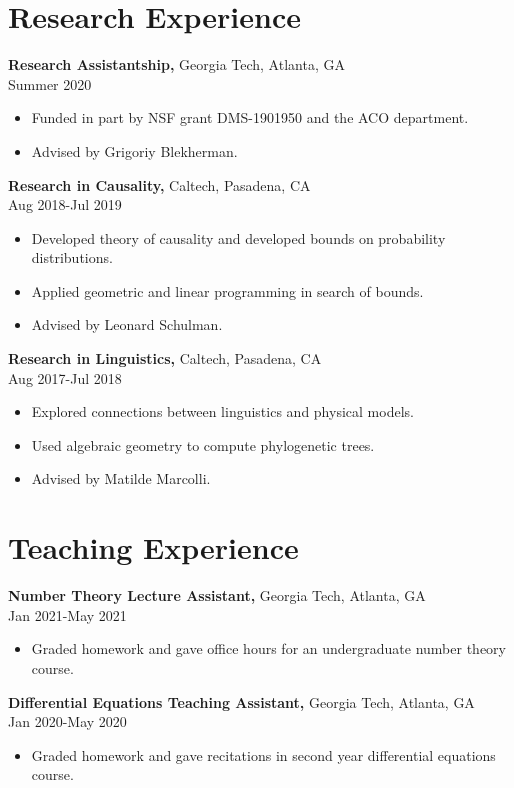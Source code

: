 \documentclass[margin]{res}
\begin{document}
\begin{resume}
\section{Research Experience}
{\bf Research Assistantship,} Georgia Tech, Atlanta, GA \\ Summer 2020
\begin{itemize} \itemsep -2pt %
\item Funded in part by NSF grant DMS-1901950 and the ACO department.
\item Advised by Grigoriy Blekherman.
\end{itemize}
 
{\bf Research in Causality,} Caltech, Pasadena, CA \\ Aug 2018-Jul 2019
\begin{itemize} \itemsep -2pt %
\item Developed theory of causality and developed bounds on probability distributions.
\item Applied geometric and linear programming in search of bounds.
\item Advised by Leonard Schulman.
\end{itemize}
 
{\bf Research in Linguistics,} Caltech, Pasadena, CA \\ Aug 2017-Jul 2018
\begin{itemize} \itemsep -2pt %
\item Explored connections between linguistics and physical models.
\item Used algebraic geometry to compute phylogenetic trees.
\item Advised by Matilde Marcolli.
\end{itemize}

\section{Teaching Experience}
{\bf Number Theory Lecture Assistant,} Georgia Tech, Atlanta, GA \\ Jan 2021-May 2021
\begin{itemize} \itemsep -2pt %
    \item Graded homework and gave office hours for an undergraduate number theory course.
\end{itemize}
{\bf Differential Equations Teaching Assistant,} Georgia Tech, Atlanta, GA \\ Jan 2020-May 2020
\begin{itemize} \itemsep -2pt %
    \item Graded homework and gave recitations in second year differential equations course.
\end{itemize}


\end{resume}
\end{document}
